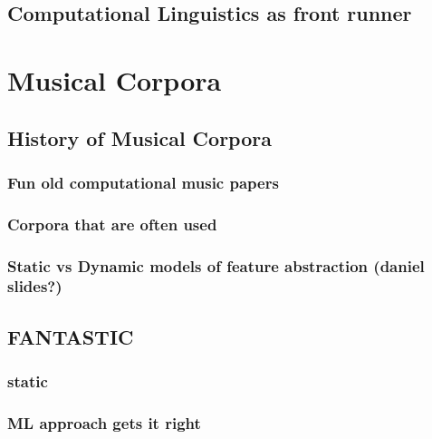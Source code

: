 \documentclass[]{book}
\theoremstyle{definition}
\theoremstyle{definition}
\theoremstyle{definition}
\theoremstyle{remark}
\begin{document}
\hypertarget{computational-linguistics-as-front-runner}{%
\subsection{Computational Linguistics as front
runner}\label{computational-linguistics-as-front-runner}}

\hypertarget{musical-corpora}{%
\section{Musical Corpora}\label{musical-corpora}}

\hypertarget{history-of-musical-corpora}{%
\subsection{History of Musical
Corpora}\label{history-of-musical-corpora}}

\hypertarget{fun-old-computational-music-papers}{%
\subsubsection{Fun old computational music
papers}\label{fun-old-computational-music-papers}}

\hypertarget{corpora-that-are-often-used}{%
\subsubsection{Corpora that are often
used}\label{corpora-that-are-often-used}}

\hypertarget{static-vs-dynamic-models-of-feature-abstraction-daniel-slides}{%
\subsubsection{Static vs Dynamic models of feature abstraction (daniel
slides?)}\label{static-vs-dynamic-models-of-feature-abstraction-daniel-slides}}

\hypertarget{fantastic}{%
\subsection{FANTASTIC}\label{fantastic}}

\hypertarget{static}{%
\subsubsection{static}\label{static}}

\hypertarget{ml-approach-gets-it-right}{%
\subsubsection{ML approach gets it
right}\label{ml-approach-gets-it-right}}
\end{document}
